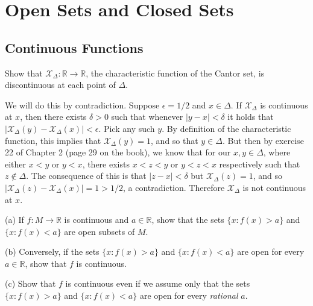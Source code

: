 \chapter{Open Sets and Closed Sets}

\section{Continuous Functions}

\begin{exercise}{4}
    Show that $\mathcal{X}_\Delta : \mathbb{R} \rightarrow \mathbb{R}$, the characteristic function of the Cantor set, is discontinuous at each point of $\Delta$.
\end{exercise}

\begin{solution}
    
    We will do this by contradiction.
    Suppose $\epsilon = 1/2$ and $x \in \Delta$.
    If $\mathcal{X}_\Delta$ is continuous at $x$, then there exists $\delta > 0$ such that whenever $\lvert y - x \rvert < \delta$ it holds that $\lvert \mathcal{X}_\Delta(y) -\mathcal{X}_\Delta(x) \rvert < \epsilon$.
    Pick any such $y$.
    By definition of the characteristic function, this implies that $\mathcal{X}_\Delta(y) = 1$, and so that $y \in \Delta$.
    But then by exercise 22 of Chapter 2 (page 29 on the book), we know that for our $x, y \in \Delta$, where either $x < y$ or $y < x$, there exists $x < z < y$ or $y < z < x$ respectively such that $z \notin \Delta$.
    The consequence of this is that $\lvert z - x \rvert < \delta$ but $\mathcal{X}_\Delta(z) = 1$, and so $\lvert \mathcal{X}_\Delta(z) - \mathcal{X}_\Delta(x) \rvert = 1 > 1/2$, a contradiction.
    Therefore $\mathcal{X}_\Delta$ is not continuous at $x$.
\end{solution}

\begin{exercise}{7}
    (a) If $f: M \rightarrow \mathbb{R}$ is continuous and $a \in \mathbb{R}$, show that the sets $\{x: f(x) > a\}$ and $\{x: f(x) < a\}$ are open subsets of $M$.

    (b) Conversely, if the sets $\{x: f(x) > a\}$ and $\{x: f(x) < a\}$ are open for every $a \in \mathbb{R}$, show that $f$ is continuous.

    (c) Show that $f$ is continuous even if we assume only that the sets $\{x: f(x) > a\}$ and $\{x: f(x) < a\}$ are open for every \textit{rational} $a$.
\end{exercise}

